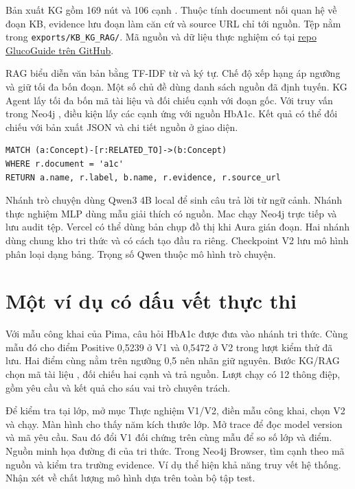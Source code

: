 Bản xuất KG gồm 169 nút  và 106 cạnh . Thuộc tính document nối quan hệ về đoạn KB, evidence lưu đoạn làm căn cứ và source URL chỉ tới nguồn. Tệp  nằm trong \nolinkurl{exports/KB_KG_RAG/}. Mã nguồn và dữ liệu thực nghiệm có tại \href{https://github.com/jellalaz/He_Thong_Thong_Minh_Thay_Que}{repo GlucoGuide trên GitHub}.



RAG biểu diễn văn bản bằng TF-IDF từ và ký tự. Chế độ xếp hạng áp ngưỡng và giữ tối đa bốn đoạn. Một số chủ đề dùng danh sách nguồn đã định tuyến. KG Agent lấy tối đa bốn mã tài liệu và đối chiếu cạnh với đoạn gốc. Với truy vấn trong Neo4j \cite{neo4j-v2}, điều kiện  lấy các cạnh ứng với nguồn HbA1c. Kết quả có thể đối chiếu với bản xuất JSON và chi tiết nguồn ở giao diện.

\begin{Verbatim}[fontsize=\small,breaklines=true]
MATCH (a:Concept)-[r:RELATED_TO]->(b:Concept)
WHERE r.document = 'a1c'
RETURN a.name, r.label, b.name, r.evidence, r.source_url
\end{Verbatim}

Nhánh trò chuyện dùng Qwen3 4B local để sinh câu trả lời từ ngữ cảnh. Nhánh thực nghiệm MLP dùng mẫu giải thích có nguồn. Mac chạy Neo4j trực tiếp và lưu audit tệp. Vercel có thể dùng bản chụp đồ thị khi Aura gián đoạn. Hai nhánh dùng chung kho tri thức và có cách tạo đầu ra riêng. Checkpoint V2 lưu mô hình phân loại dạng bảng. Trọng số Qwen thuộc mô hình trò chuyện.

\section{Một ví dụ có dấu vết thực thi}
Với mẫu công khai của Pima, câu hỏi HbA1c được đưa vào nhánh tri thức. Cùng mẫu đó cho điểm Positive 0,5239 ở V1 và 0,5472 ở V2 trong lượt kiểm thử đã lưu. Hai điểm cùng nằm trên ngưỡng 0,5 nên nhãn giữ nguyên. Bước KG/RAG chọn mã tài liệu , đối chiếu hai cạnh và trả nguồn. Lượt chạy có 12 thông điệp, gồm yêu cầu và kết quả cho sáu vai trò chuyên trách.

Để kiểm tra tại lớp, mở mục Thực nghiệm V1/V2, điền mẫu công khai, chọn V2 và chạy. Màn hình cho thấy năm kích thước lớp. Mở trace để đọc model version và mã yêu cầu. Sau đó đổi V1 đối chứng trên cùng mẫu để so số lớp và điểm. Nguồn  minh họa đường đi của tri thức. Trong Neo4j Browser, tìm cạnh theo mã nguồn và kiểm tra trường evidence. Ví dụ thể hiện khả năng truy vết hệ thống. Nhận xét về chất lượng mô hình dựa trên toàn bộ tập test.

